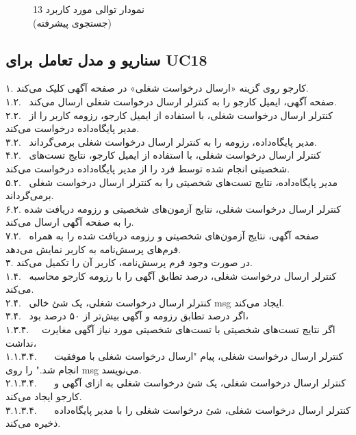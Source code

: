 \documentclass[12pt]{article}
\begin{document}
	\begin{figure}[H]
		\centering
		\caption{نمودار توالی مورد کاربرد 13\\
			(جستجوی پیشرفته)
		}
		\label{fig:sd-uc13}
	\end{figure}

	\newpage
	\subsection{سناریو و مدل تعامل برای UC18}
	۱. کارجو روی گزینه «ارسال درخواست شغلی» در صفحه آگهی کلیک می‌کند.\\
	۱.۲. \ صفحه آگهی، ایمیل کارجو را به کنترلر ارسال درخواست شغلی ارسال می‌کند.\\
	۲.۲. \ کنترلر ارسال درخواست شغلی، با استفاده از ایمیل کارجو، رزومه کاربر را از مدیر پایگاه‌داده درخواست می‌کند.\\
	۳.۲. \ مدیر پایگاه‌داده، رزومه را به کنترلر ارسال درخواست شغلی برمی‌گرداند.\\
	۴.۲. \ کنترلر ارسال درخواست شغلی، با استفاده از ایمیل کارجو، نتایج تست‌های شخصیتی انجام شده توسط فرد را از مدیر پایگاه‌داده درخواست می‌کند.\\
	۵.۲. \ مدیر پایگاه‌داده، نتایج تست‌های شخصیتی را به کنترلر ارسال درخواست شغلی برمی‌گرداند.\\
	۶.۲. کنترلر ارسال درخواست شغلی، نتایج آزمون‌های شخصیتی و رزومه دریافت شده را به صفحه آگهی ارسال می‌کند.\\
	۷.۲. \ صفحه آگهی، نتایج آزمون‌های شخصیتی و رزومه دریافت شده را به همراه فرم‌های پرسش‌نامه به کاربر نمایش می‌دهد.\\
	۳. در صورت وجود فرم پرسش‌نامه، کاربر آن را تکمیل می‌کند.\\
	۱.۴. \ کنترلر ارسال درخواست شغلی، درصد تطابق آگهی را با رزومه کارجو محاسبه می‌کند.\\
	۲.۴. \ کنترلر ارسال درخواست شغلی، یک شئ خالی msg ایجاد می‌کند.\\
	۳.۴. \ اگر درصد تطابق رزومه و آگهی بیش‌تر از ۵۰ درصد بود،\\
	۱.۳.۴. \ \ اگر نتایج تست‌های شخصیتی با تست‌های شخصیتی مورد نیاز آگهی مغایرت نداشت،\\
	۱.۱.۳.۴. \ \ \ کنترلر ارسال درخواست شغلی، پیام "ارسال درخواست شغلی با موفقیت انجام شد." را روی msg می‌نویسد.\\
	۲.۱.۳.۴. \ \ \ کنترلر ارسال درخواست شغلی، یک شئ درخواست شغلی به ازای آگهی و کارجو ایجاد می‌کند.\\
	۳.۱.۳.۴. \ \ \ کنترلر ارسال درخواست شغلی، شئ درخواست شغلی را با مدیر پایگاه‌داده ذخیره می‌کند.\\
\end{document}
